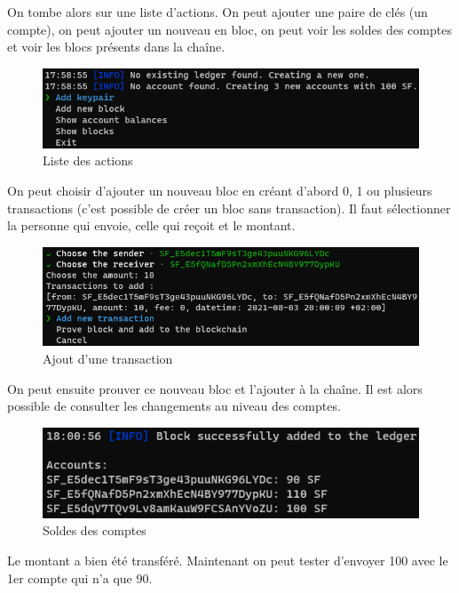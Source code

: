 On tombe alors sur une liste d'actions. On peut ajouter une paire de clés (un compte), on peut ajouter un nouveau en bloc, on peut voir les soldes des comptes et voir les blocs présents dans la chaîne.

\begin{figure}[H]
  \centering
  \includegraphics[width=\textwidth]{images/chain_home.png}
  \caption{Liste des actions}
\end{figure}

\newpage

On peut choisir d'ajouter un nouveau bloc en créant d'abord 0, 1 ou plusieurs transactions (c'est possible de créer un bloc sans transaction). Il faut sélectionner la personne qui envoie, celle qui reçoit et le montant.

\begin{figure}[H]
  \centering
  \includegraphics[width=\textwidth]{images/chain_add_transaction.png}
  \caption{Ajout d'une transaction}
\end{figure}

On peut ensuite prouver ce nouveau bloc et l'ajouter à la chaîne. Il est alors possible de consulter les changements au niveau des comptes.

\begin{figure}[H]
  \centering
  \includegraphics[width=\textwidth]{images/chain_balances.png}
  \caption{Soldes des comptes}
\end{figure}

Le montant a bien été transféré. Maintenant on peut tester d'envoyer 100 avec le 1er compte qui n'a que 90.

